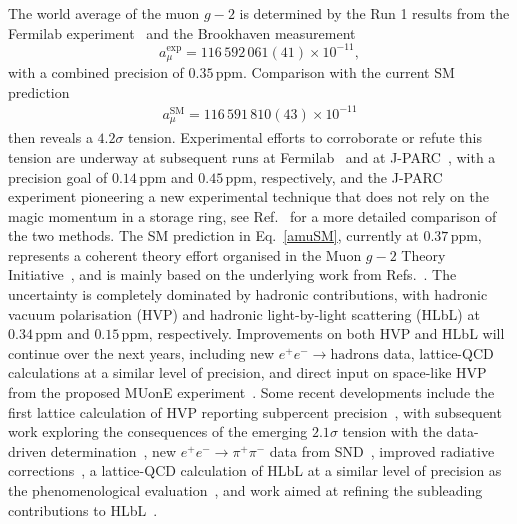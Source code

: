 \documentclass[10pt]{article}
\begin{document}
The world average of the muon $g-2$ is determined by the Run 1 results from the Fermilab experiment~\cite{Abi:2021gix,Albahri:2021ixb,Albahri:2021kmg,Albahri:2021mtf} and the Brookhaven measurement~\cite{Bennett:2006fi}
\begin{equation}
 a_\mu^\text{exp}=116\,592\,061(41)\times 10^{-11},
\end{equation}
with a combined precision of $0.35\,\text{ppm}$. Comparison with the current SM prediction~\cite{Aoyama:2020ynm}
\begin{align}
\label{amuSM}
a_\mu^\text{SM}=116\,591\,810(43)\times 10^{-11}
\end{align}
then reveals a $4.2\sigma$ tension. Experimental efforts to corroborate or refute this tension are underway at subsequent runs at Fermilab~\cite{Grange:2015fou} and at J-PARC~\cite{Abe:2019thb}, with a precision goal of $0.14\,\text{ppm}$ and $0.45\,\text{ppm}$, respectively, and the J-PARC experiment pioneering a new experimental technique that does not rely on the magic momentum in a storage ring, see Ref.~\cite{Gorringe:2015cma} for a more detailed comparison of the two methods. 
The SM prediction in Eq.~\eqref{amuSM}, currently at $0.37\,\text{ppm}$, represents a coherent theory effort organised in the Muon $g-2$ Theory Initiative~\cite{Aoyama:2020ynm}, and is mainly based on the underlying work from 
Refs.~\cite{Aoyama:2012wk,Aoyama:2019ryr,Czarnecki:2002nt,Gnendiger:2013pva,Davier:2017zfy,Keshavarzi:2018mgv,Colangelo:2018mtw,Hoferichter:2019gzf,Davier:2019can,Keshavarzi:2019abf,Kurz:2014wya,Melnikov:2003xd,Masjuan:2017tvw,Colangelo:2017fiz,Hoferichter:2018kwz,Gerardin:2019vio,Bijnens:2019ghy,Colangelo:2019uex,Blum:2019ugy,Colangelo:2014qya}. The uncertainty is completely dominated by hadronic contributions, with hadronic vacuum polarisation (HVP) and hadronic light-by-light scattering (HLbL) at $0.34\,\text{ppm}$ and $0.15\,\text{ppm}$, respectively. Improvements on both HVP and HLbL will continue over the next years, including new $e^+e^-\to \text{hadrons}$ data, lattice-QCD calculations at a similar level of precision, and direct input on space-like HVP from the proposed MUonE experiment~\cite{MUonE:LoI,Banerjee:2020tdt}. Some recent developments include the first lattice calculation of HVP reporting subpercent precision~\cite{Borsanyi:2020mff}, with subsequent work exploring the consequences of the emerging $2.1\sigma$ tension with the data-driven determination~\cite{Lehner:2020crt,Crivellin:2020zul,Keshavarzi:2020bfy,Malaescu:2020zuc,Colangelo:2020lcg}, new $e^+e^-\to \pi^+\pi^-$ data from SND~\cite{Achasov:2020iys}, improved radiative corrections~\cite{Campanario:2019mjh}, a lattice-QCD calculation of HLbL at a similar level of precision as the phenomenological evaluation~\cite{Chao:2021tvp}, and work aimed at refining the subleading contributions to HLbL~\cite{Hoferichter:2020lap,Bijnens:2020xnl,Bijnens:2021jqo,Zanke:2021wiq,Danilkin:2021icn,Colangelo:2021nkr}. 
\end{document}
